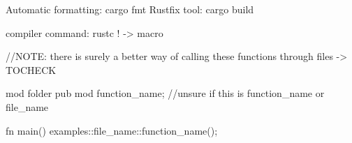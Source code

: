 Automatic formatting: cargo fmt
Rustfix tool: cargo build

compiler command: rustc
! -> macro

//NOTE: there is surely a better way of calling these functions through files -> TOCHECK


mod folder {pub mod function_name;} //unsure if this is function_name or file_name

fn main() {
    examples::file_name::function_name(); 
}
